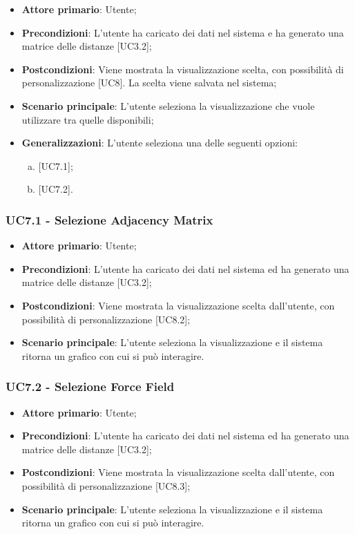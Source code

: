 \begin{itemize}
	\item \textbf{Attore primario}: Utente;
	\item \textbf{Precondizioni}: L'utente ha caricato dei dati nel sistema e ha generato una matrice delle distanze [UC3.2];
	\item \textbf{Postcondizioni}: Viene mostrata la visualizzazione scelta, con possibilità di personalizzazione [UC8]. La scelta viene salvata nel sistema;
	\item \textbf{Scenario principale}: L'utente seleziona la visualizzazione che vuole utilizzare tra quelle disponibili;
	\item \textbf{Generalizzazioni}: L'utente seleziona una delle seguenti opzioni:
		\begin{enumerate}[(a)]
			\item {} [UC7.1];
			\item {} [UC7.2].
		\end{enumerate}

\end{itemize}

\subsubsection{UC7.1 - Selezione Adjacency Matrix}
\begin{itemize}
	\item \textbf{Attore primario}: Utente;
	\item \textbf{Precondizioni}: L'utente ha caricato dei dati nel sistema ed ha generato una matrice delle distanze [UC3.2];
	\item \textbf{Postcondizioni}: Viene mostrata la visualizzazione  scelta dall'utente, con possibilità di personalizzazione [UC8.2];
	\item \textbf{Scenario principale}: L'utente seleziona la visualizzazione  e il sistema ritorna un grafico con cui si può interagire.

\end{itemize}

\subsubsection{UC7.2 - Selezione Force Field}
\begin{itemize}
	\item \textbf{Attore primario}: Utente;
	\item \textbf{Precondizioni}: L'utente ha caricato dei dati nel sistema ed ha generato una matrice delle distanze [UC3.2];
	\item \textbf{Postcondizioni}: Viene mostrata la visualizzazione  scelta dall'utente, con possibilità di personalizzazione [UC8.3];
	\item \textbf{Scenario principale}: L'utente seleziona la visualizzazione  e il sistema ritorna un grafico con cui si può interagire.
\end{itemize}